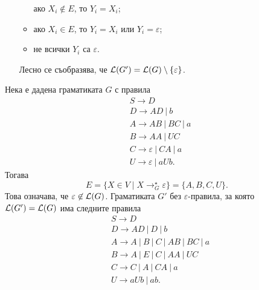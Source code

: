 \begin{hint}
\begin{enumerate}[1)]
\begin{itemize}[-]
      ако $X_i \not\in E$, то $Y_i = X_i$;
    \item
      ако $X_i \in E$, то $Y_i = X_i$ или $Y_i = \varepsilon$;
    \item
      не всички $Y_i$ са $\varepsilon$.
    \end{itemize}
    Лесно се съобразява, че $\mathcal{L}(G') = \mathcal{L}(G) \setminus \{\varepsilon\}$.
  \end{enumerate}
\end{hint}

\begin{example}
  Нека е дадена граматиката $G$ с правила
  \begin{align*}
    & S \to D\\
    & D \to AD\ |\ b\\
    & A \to AB\ |\ BC\ |\ a\\
    & B \to AA\ |\ UC\\
    & C \to \varepsilon\ |\ CA\ |\ a\\
    & U \to \varepsilon\ |\ aUb.
  \end{align*}
  Тогава
  \[E = \{X \in V \mid X \rightarrow^\star_G \varepsilon\} = \{A,B,C,U\}.\]
  Това означава, че $\varepsilon \not\in \mathcal{L}(G)$.
  Граматиката $G'$ без $\varepsilon$-правила, за която $\mathcal{L}(G') = \mathcal{L}(G)$ има следните правила
  \begin{align*}
    & S \to D \\
    & D\to AD\ |\ D\ |\ b \\
    & A \to A\ |\ B\ |\ C\ |\ AB\ |\ BC\ |\ a \\
    & B\to A\ |\ E\ |\ C\ |\ AA\ |\ UC\\
    & C \to C\ |\ A\ |\ CA\ |\ a\\
    & U \to aUb\ |\ ab.
  \end{align*}
\end{example}

